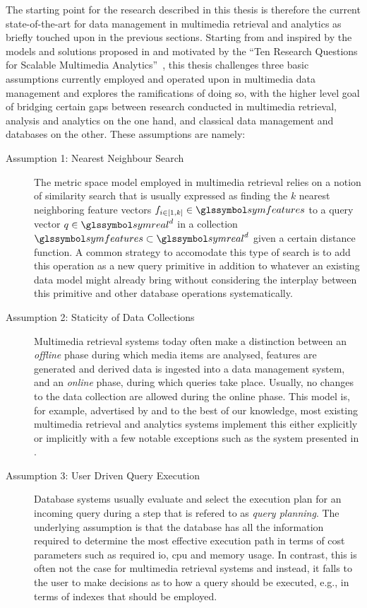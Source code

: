 The starting point for the research described in this thesis is therefore the current state-of-the-art for data management in multimedia retrieval and analytics as briefly touched upon in the previous sections. Starting from and inspired by the models and solutions proposed in \cite{Giangreco:2016Adam,Giangreco:2018Database} and motivated by the ``Ten Research Questions for Scalable Multimedia Analytics''~\cite{Jonson:2016Ten}, this thesis challenges three basic assumptions currently employed and operated upon in multimedia data management and explores the ramifications of doing so, with the higher level goal of bridging certain gaps between research conducted in multimedia retrieval, analysis and analytics on the one hand, and classical data management and databases on the other. These assumptions are namely:

\begin{description}
    \item[Assumption 1: Nearest Neighbour Search] The metric space model employed in multimedia retrieval \cite{Zezula:2006Similarity} relies on a notion of similarity search that is usually expressed as finding the $k$ nearest neighboring feature vectors $f_{i \in \left[1,k\right]} \in \symfeatures$ to a query vector $q \in \symreal^d$ in a collection $\symfeatures \subset \symreal^d$ given a certain distance function. A common strategy to accomodate this type of search is to add this operation as a new query primitive in addition to whatever an existing data model might already bring \cite{Guliato:2009PostgreSQL,Giangreco:2016Adam,Yang:2020Pase} without considering the interplay between this primitive and other database operations systematically.

    \item[Assumption 2: Staticity of Data Collections] Multimedia retrieval systems today often make a distinction between an \emph{offline} phase during which media items are analysed, features are generated and derived data is ingested into a data management system, and an \emph{online} phase, during which queries take place. Usually, no changes to the data collection are allowed during the online phase. This model is, for example, advertised by \cite{Flickner:1995Query,Kiranyaz:2003Muvis,Giangreco:2018Database,Rossetto:2018Multi} and to the best of our knowledge, most existing multimedia retrieval and analytics systems implement this either explicitly or implicitly with a few notable exceptions such as the system presented in \cite{Wang:2021Milvus}.

    \item[Assumption 3: User Driven Query Execution] Database systems usually evaluate and select the execution plan for an incoming query during a step that is refered to as \emph{query planning}. The underlying assumption is that the database has all the information required to determine the most effective execution path in terms of cost parameters such as required \acrshort{io}, \acrshort{cpu} and memory usage. In contrast, this is often not the case for multimedia retrieval systems and instead, it falls to the user to make decisions as to how a query should be executed, e.g., in terms of indexes that should be employed.
\end{description}

